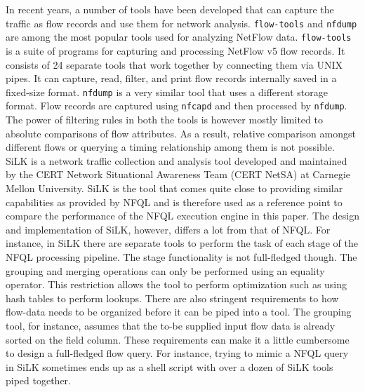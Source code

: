 
In recent years, a number of tools have been developed that can capture the
traffic as flow records and use them for network analysis. \texttt{flow-tools}
and \texttt{nfdump} are among the most popular tools used for analyzing
NetFlow data. \texttt{flow-tools} \cite{sromig:2000} is a suite of programs
for capturing and processing NetFlow v5 flow records. It consists of 24
separate tools that work together by connecting them via UNIX pipes. It can
capture, read, filter, and print flow records internally saved in a fixed-size
format. \texttt{nfdump} \cite{phaag:2006} is a very similar tool that uses a
different storage format. Flow records are captured using \texttt{nfcapd} and
then processed by \texttt{nfdump}. The power of filtering rules in both the
tools is however mostly limited to absolute comparisons of flow attributes. As
a result, relative comparison amongst different flows or querying a timing
relationship among them is not possible.  SiLK \cite{SiLK} is a network
traffic collection and analysis tool developed and maintained by the CERT
Network Situational Awareness Team (CERT NetSA) at Carnegie Mellon University.
SiLK is the tool that comes quite close to providing similar capabilities as
provided by \ac{NFQL} and is therefore used as a reference point to compare
the performance of the \ac{NFQL} execution engine in this paper. The design
and implementation of SiLK, however, differs a lot from that of \ac{NFQL}. For
instance, in SiLK there are separate tools to perform the task of each stage
of the \ac{NFQL} processing pipeline. The stage functionality is not
full-fledged though. The grouping and merging operations can only be performed
using an equality operator. This restriction allows the tool to perform
optimization such as using hash tables to perform lookups. There are also
stringent requirements to how flow-data needs to be organized before it can be
piped into a tool. The grouping tool, for instance, assumes that the to-be
supplied input flow data is already sorted on the field column.  These
requirements can make it a little cumbersome to design a full-fledged flow
query.  For instance, trying to mimic a \ac{NFQL} query in SiLK sometimes ends
up as a shell script with over a dozen of SiLK tools piped together.
